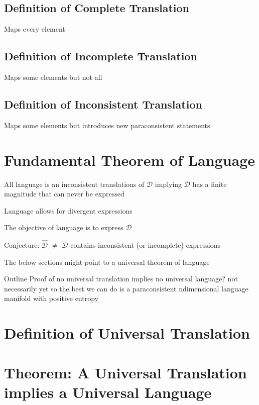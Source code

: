 \documentclass[11pt]{article}
\begin{document}
\subsection{Definition of Complete Translation}
Maps every element

\subsection{Definition of Incomplete Translation}
Maps some elements but not all

\subsection{Definition of Inconsistent Translation}
Maps some elements but introduces new paraconsistent statements





\section{Fundamental Theorem of Language}

All language is an inconsistent translations of $\mathcal{D}$
implying $\mathcal{D}$ has a finite magnitude that can never be expressed

Language allows for divergent expressions

The objective of language is to express $\mathcal{D}$

Conjecture: $\hat{\mathcal{D}}$ $\neq$ $\mathcal{D}$ contains inconsistent (or incomplete) expressions

The below sections might point to a universal theorem of language

Outline
Proof of no universal translation
implies no universal language? not necessarily yet
so the best we can do is a paraconsistent ndimensional language manifold with positive entropy



\section{Definition of Universal Translation}







\section{Theorem: A Universal Translation implies a Universal Language}
\end{document}
